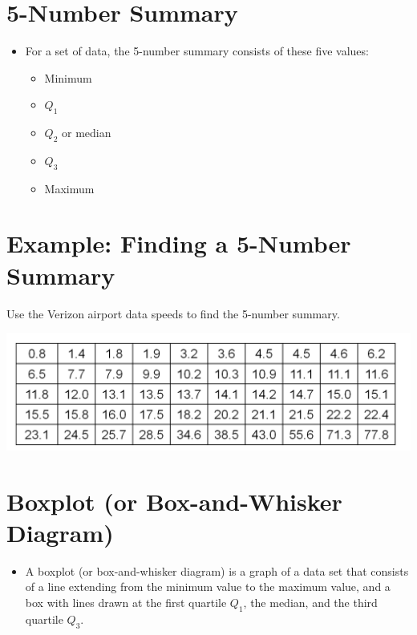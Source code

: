 \documentclass[]{book}
\providecommand{\tightlist}{%
  \setlength{\itemsep}{0pt}\setlength{\parskip}{0pt}}
\begin{document}
\hypertarget{number-summary}{%
\section{5-Number Summary}\label{number-summary}}

\begin{itemize}
\tightlist
\item
  For a set of data, the 5-number summary consists of these five values:

  \begin{itemize}
  \tightlist
  \item
    Minimum
  \item
    \(Q_1\)
  \item
    \(Q_2\) or median
  \item
    \(Q_3\)
  \item
    Maximum
  \end{itemize}
\end{itemize}

\hypertarget{example-finding-a-5-number-summary}{%
\section{Example: Finding a 5-Number Summary}\label{example-finding-a-5-number-summary}}

Use the Verizon airport data speeds to find the 5-number summary.

\includegraphics{pic13.png}

\hypertarget{boxplot-or-box-and-whisker-diagram}{%
\section{Boxplot (or Box-and-Whisker Diagram)}\label{boxplot-or-box-and-whisker-diagram}}

\begin{itemize}
\tightlist
\item
  A boxplot (or box-and-whisker diagram) is a graph of a data set that consists of a line extending from the minimum value to the maximum value, and a box with lines drawn at the first quartile \(Q_1\), the median, and the third quartile \(Q_3\).
\end{itemize}
\end{document}
